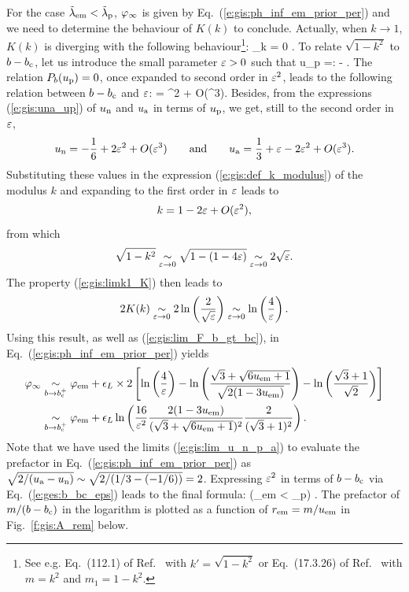 For the case ${\tilde\lambda}_{\rm em} < {\tilde\lambda}_{\rm p}$, $\varphi_\infty$ is given
by Eq.~(\ref{e:gis:ph_inf_em_prior_per}) and
we need to determine the behaviour of $K(k)$ to conclude.
Actually, when $k\to 1$, $K(k)$ is diverging with the following behaviour\footnote{See e.g. Eq.~(112.1) of Ref.~\cite{ByrdF71} with
$k' = \sqrt{1-k^2}$ or Eq.~(17.3.26) of
Ref.~\cite{AbramS72} with $m = k^2$ and $m_1 = 1 - k^2$.}:
\be \label{e:gis:limk1_K}
    \lim_{k}  = 0 .
\ee
To relate $\sqrt{1 - k^2}$ to $b - b_{\rm c}$, let us introduce the small parameter
$\varepsilon >0$ such that
\be \label{e:ges:u_per_eps}
    u_{\rm p} =:  - \veps.
\ee
The relation $P_b(u_{\rm p}) = 0$, once expanded to second
order in $\varepsilon^2$, leads to the following relation between $b - b_{\rm c}$
and $\varepsilon$:
\be \label{e:ges:b_bc_eps}
     =  \veps^2 + O(\veps^3).
\ee
Besides, from the expressions (\ref{e:gis:una_up}) of $u_{\rm n}$ and
$u_{\rm a}$ in terms of $u_{\rm p}$, we get, still to the second order in $\varepsilon$,
\[
    u_{\rm n} = - \frac{1}{6} + 2 \varepsilon^2 + O(\varepsilon^3)
    \qquad\mbox{and}\qquad
    u_{\rm a} = \frac{1}{3} + \varepsilon - 2 \varepsilon^2
     + O(\varepsilon^3) .
\]
Substituting these values in the expression (\ref{e:gis:def_k_modulus})
of the modulus $k$ and expanding to the first order in $\varepsilon$ leads to
\[
    k = 1 - 2 \varepsilon + O(\varepsilon^2),
\]
from which
\[
    \sqrt{1 - k^2} \underset{\varepsilon\to 0}{\sim} \sqrt{1 - (1 - 4\varepsilon)}
            \underset{\varepsilon\to 0}{\sim}  2 \sqrt{\varepsilon} .
\]
The property (\ref{e:gis:limk1_K}) then leads to
\[
    2 K(k) \underset{\varepsilon\to 0}{\sim} 2 \ln\left(\frac{2}{\sqrt{\varepsilon}}\right)
       \underset{\varepsilon\to 0}{\sim} \ln\left(\frac{4}{\varepsilon}\right)  .
\]
Using this result, as well as (\ref{e:gis:lim_F_b_gt_bc}), in
Eq.~(\ref{e:gis:ph_inf_em_prior_per}) yields
\begin{align}
  \varphi_\infty & \underset{b\to b_{\rm c}^+}{\sim} \varphi_{\rm em}
   + \epsilon_L \times 2 \left[ \ln\left(\frac{4}{\varepsilon}\right)
   - \ln \left(
     \frac{\sqrt{3} + \sqrt{6 u_{\rm em} + 1 }}{\sqrt{2(1 - 3 u_{\rm em})}} \right)
   - \ln \left(\frac{\sqrt{3} + 1}{\sqrt{2}} \right) \right] \nonumber \\
   & \underset{b\to b_{\rm c}^+}{\sim} \varphi_{\rm em}
   + \epsilon_L \ln\left(\frac{16}{\varepsilon^2}
   \frac{2(1 - 3 u_{\rm em})}{(\sqrt{3} + \sqrt{6 u_{\rm em} + 1 })^2}
   \frac{2}{(\sqrt{3} + 1)^2} \right) . \nonumber
\end{align}
Note that we have used the limits (\ref{e:gis:lim_u_n_p_a})
to evaluate the prefactor in Eq.~(\ref{e:gis:ph_inf_em_prior_per})
as $\sqrt{2/(u_{\rm a} - u_{\rm n})} \sim \sqrt{2/(1/3 - (-1/6))} = 2$.
Expressing $\varepsilon^2$ in terms of $b - b_{\rm c}$ via Eq.~(\ref{e:ges:b_bc_eps})
leads to the final formula:
\be \label{e:gis:ph_inf_ph_em_lim_b_gt_bc}
    \qquad (\tlamb_{\rm em} < \tlamb_{\rm p}) .
\ee
The prefactor of $m/(b - b_{\rm c})$ in the logarithm is
plotted as a function of $r_{\rm em} = m/u_{\rm em}$ in Fig.~\ref{f:gis:A_rem} below.

